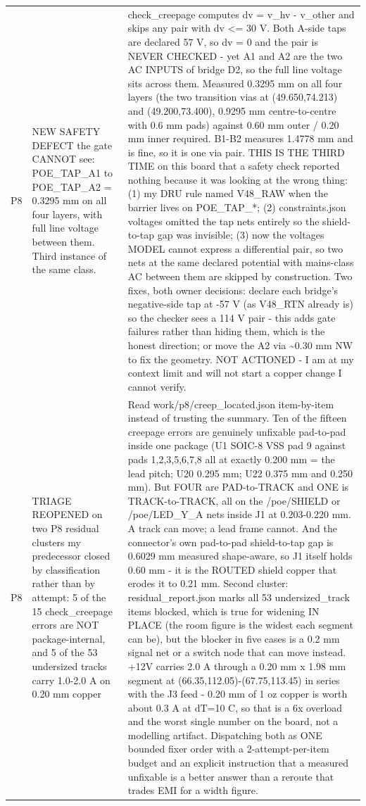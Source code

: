 \documentclass[11pt,a4paper]{article}
\begin{document}
{\begin{longtable}{lp{5.2cm}p{7.2cm}}
P8 & NEW SAFETY DEFECT the gate CANNOT see: POE\_TAP\_A1 to POE\_TAP\_A2 = 0.3295 mm on all four layers, with full line voltage between them. Third instance of the same class. & check\_creepage computes dv = v\_hv - v\_other and skips any pair with \textbar{}dv\textbar{} \textless{}= 30 V. Both A-side taps are declared 57 V, so dv = 0 and the pair is NEVER CHECKED - yet A1 and A2 are the two AC INPUTS of bridge D2, so the full line voltage sits across them. Measured 0.3295 mm on all four layers (the two transition vias at (49.650,74.213) and (49.200,73.400), 0.9295 mm centre-to-centre with 0.6 mm pads) against 0.60 mm outer / 0.20 mm inner required. B1-B2 measures 1.4778 mm and is fine, so it is one via pair. THIS IS THE THIRD TIME on this board that a safety check reported nothing because it was looking at the wrong thing: (1) my DRU rule named V48\_RAW when the barrier lives on POE\_TAP\_{*}; (2) constraints.json voltages omitted the tap nets entirely so the shield-to-tap gap was invisible; (3) now the voltages MODEL cannot express a differential pair, so two nets at the same declared potential with mains-class AC between them are skipped by construction. Two fixes, both owner decisions: declare each bridge's negative-side tap at -57 V (as V48\_RTN already is) so the checker sees a 114 V pair - this adds gate failures rather than hiding them, which is the honest direction; or move the A2 via \textasciitilde{}0.30 mm NW to fix the geometry. NOT ACTIONED - I am at my context limit and will not start a copper change I cannot verify. \\
P8 & TRIAGE REOPENED on two P8 residual clusters my predecessor closed by classification rather than by attempt: 5 of the 15 check\_creepage errors are NOT package-internal, and 5 of the 53 undersized tracks carry 1.0-2.0 A on 0.20 mm copper & Read work/p8/creep\_located.json item-by-item instead of trusting the summary. Ten of the fifteen creepage errors are genuinely unfixable pad-to-pad inside one package (U1 SOIC-8 VSS pad 9 against pads 1,2,3,5,6,7,8 all at exactly 0.200 mm = the lead pitch; U20 0.295 mm; U22 0.375 mm and 0.250 mm). But FOUR are PAD-to-TRACK and ONE is TRACK-to-TRACK, all on the /poe/SHIELD or /poe/LED\_Y\_A nets inside J1 at 0.203-0.220 mm. A track can move; a lead frame cannot. And the connector's own pad-to-pad shield-to-tap gap is 0.6029 mm measured shape-aware, so J1 itself holds 0.60 mm - it is the ROUTED shield copper that erodes it to 0.21 mm. Second cluster: residual\_report.json marks all 53 undersized\_track items blocked, which is true for widening IN PLACE (the room figure is the widest each segment can be), but the blocker in five cases is a 0.2 mm signal net or a switch node that can move instead. +12V carries 2.0 A through a 0.20 mm x 1.98 mm segment at (66.35,112.05)-(67.75,113.45) in series with the J3 feed - 0.20 mm of 1 oz copper is worth about 0.3 A at dT=10 C, so that is a 6x overload and the worst single number on the board, not a modelling artifact. Dispatching both as ONE bounded fixer order with a 2-attempt-per-item budget and an explicit instruction that a measured unfixable is a better answer than a reroute that trades EMI for a width figure. \\

\end{longtable}}
\end{document}

